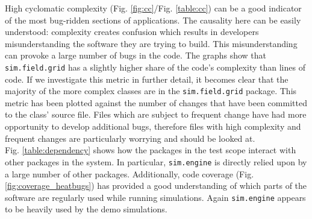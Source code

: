 \documentclass[11pt]{article}
\begin{document}
High cyclomatic complexity (Fig. \ref{fig:cc}/Fig. \ref{table:cc}) can be a good indicator of the most bug-ridden sections of applications.
The causality here can be easily understood: complexity creates confusion which results in developers misunderstanding the software they are trying to build.
This misunderstanding can provoke a large number of bugs in the code.
The graphs show that \texttt{sim.field.grid} has a slightly higher share of the code's complexity than lines of code.
If we investigate this metric in further detail, it becomes clear that the majority of the more complex classes are in the \texttt{sim.field.grid} package.
This metric has been plotted against the number of changes that have been committed to the class' source file.
Files which are subject to frequent change have had more opportunity to develop additional bugs, therefore files with high complexity and frequent changes are particularly worrying and should be looked at.
\\

Fig. \ref{table:dependency} shows how the packages in the test scope interact with other packages in the system.
In particular, \texttt{sim.engine} is directly relied upon by a large number of other packages.
Additionally, code coverage (Fig. \ref{fig:coverage_heatbugs}) has provided a good understanding of which parts of the software are regularly used while running simulations.
Again \texttt{sim.engine} appears to be heavily used by the demo simulations.
\\
\end{document}
